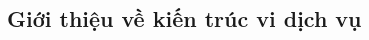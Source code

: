 \documentclass{article} %
\begin{document}
% 


% 


% 


% 

\subsection{Giới thiệu về kiến trúc vi dịch vụ}

% 


% 


% 

\end{document}
